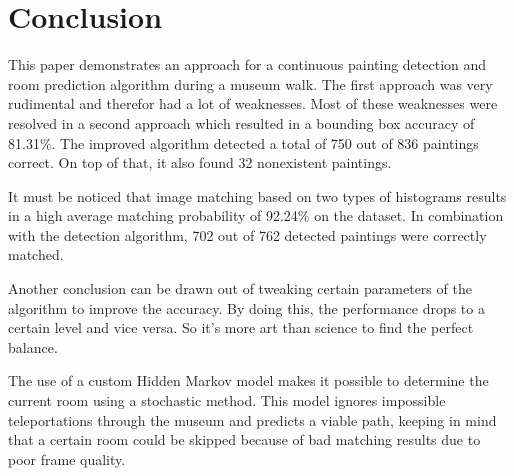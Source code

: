 \section{Conclusion}
\label{sec:conclusion}

This paper demonstrates an approach for a continuous painting detection and room prediction algorithm during a museum walk. The first approach was very rudimental and therefor had a lot of weaknesses. Most of these weaknesses were resolved in a second approach which resulted in a bounding box accuracy of 81.31\%. The improved algorithm detected a total of 750 out of 836 paintings correct. On top of that, it also found 32 nonexistent paintings.

It must be noticed that image matching based on two types of histograms results in a high average matching probability of 92.24\% on the dataset. In combination with the detection algorithm, 702 out of 762 detected paintings were correctly matched.

Another conclusion can be drawn out of tweaking certain parameters of the algorithm to improve the accuracy. By doing this, the performance drops to a certain level and vice versa. So it's more art than science to find the perfect balance.

The use of a custom Hidden Markov model makes it possible to determine the current room using a stochastic method. This model ignores impossible teleportations through the museum and predicts a viable path, keeping in mind that a certain room could be skipped because of bad matching results due to poor frame quality.

